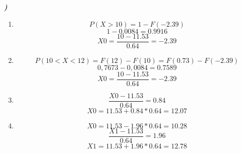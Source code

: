 \documentclass[12pt]{article}
\newcounter{instn}
\newcommand{\instnum}{\arabic{instn}}
\newcommand{\myline}[1]{
    \emph{\textbf{#1)}}
    \addtocounter{instn}{1}
}
\newenvironment{question}
 {
    \myline{\instnum} 
    }
    {
 }
\begin{document}

    \begin{question}
        \begin{enumerate}[label={\textbf{\alph*)}}]
            \item 
            \[
                P(X >10) = 1 - F(-2.39)    
            \]
            \[
                1 - 0.0084 = 0.9916 
            \]
            \[
                X0 = \frac{10-11.53}{0.64} = -2.39
            \]
            \item 
            \[
                P(10 < X < 12) = F(12) - F(10) = F(0.73) - F(-2.39) 
            \]
            \[
                0,7673 -0,0084 = 0.7589
            \]
            \[
                X0 = \frac{10-11.53}{0.64} = -2.39
            \]
            \item
            \[
                \frac{X0-11.53}{0.64} = 0.84    
            \]  
            \begin{equation}
                X0 = 11.53 + 0.84 * 0.64 = 12.07
            \end{equation}
            \item 
            \[
                X0 = 11.53 -1.96 * 0.64 = 10.28  
            \]  
            \[
                \frac{X1-11.53}{0.64} = 1.96    
            \]  
            \begin{equation}
                X1 = 11.53 + 1.96 * 0.64 = 12.78
            \end{equation}
        \end{enumerate}

    \end{question}

\end{document}
